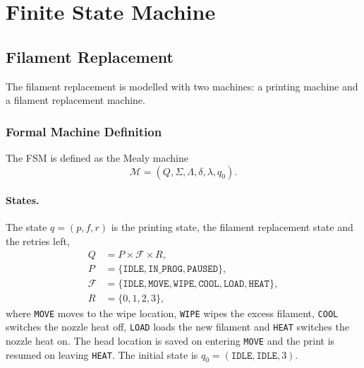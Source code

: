 \section{Finite State Machine}
\label{sec:finite_state_machine}

\subsection{Filament Replacement}
\label{subsec:fsm_filament}

The filament replacement is modelled with two machines: a printing machine and a filament replacement machine.

\subsubsection{Formal Machine Definition}
\label{subsubsec:fsm_definition}

The FSM is defined as the Mealy machine
\begin{equation}
\label{eq:fsm_tuple}
\mathcal{M} = (Q, \Sigma, \Lambda, \delta, \lambda, q_0).
\end{equation}

\paragraph{States.} The state $q = (p, f, r)$ is the printing state, the filament replacement state and the retries left,
\begin{equation}
\label{eq:fsm_states}
\begin{aligned}
Q &= P \times \mathcal{F} \times R, \\
P &= \{\texttt{IDLE}, \texttt{IN\_PROG}, \texttt{PAUSED}\}, \\
\mathcal{F} &= \{\texttt{IDLE}, \texttt{MOVE}, \texttt{WIPE}, \texttt{COOL}, \texttt{LOAD}, \texttt{HEAT}\}, \\
R &= \{0, 1, 2, 3\},
\end{aligned}
\end{equation}
where \texttt{MOVE} moves to the wipe location, \texttt{WIPE} wipes the excess filament, \texttt{COOL} switches the nozzle heat off, \texttt{LOAD} loads the new filament and \texttt{HEAT} switches the nozzle heat on. The head location is saved on entering \texttt{MOVE} and the print is resumed on leaving \texttt{HEAT}. The initial state is $q_0 = (\texttt{IDLE}, \texttt{IDLE}, 3)$.



